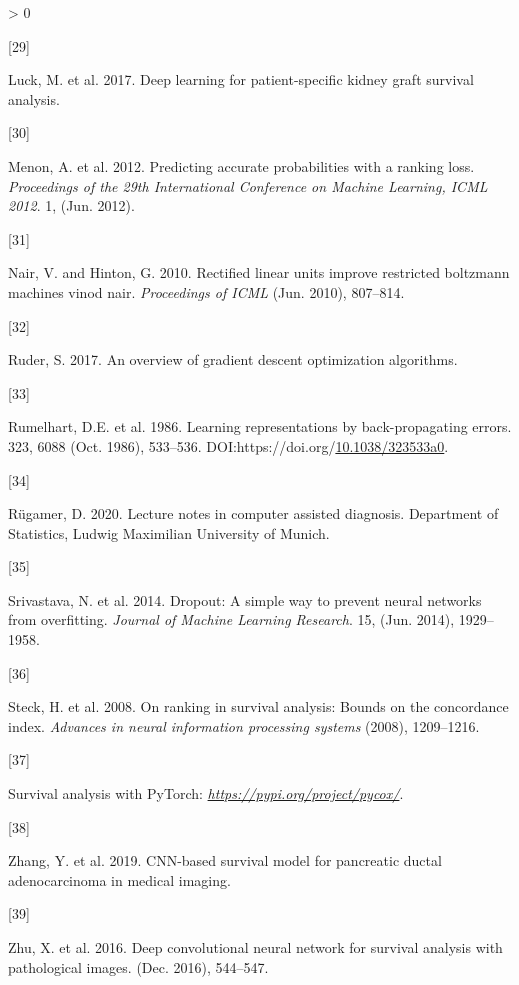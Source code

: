 \documentclass[
]{article}
\newlength{\cslhangindent}
\newlength{\csllabelwidth}
\newenvironment{CSLReferences}[2] %
 {%
  \setlength{\parindent}{0pt}
  \ifodd #1 \everypar{\setlength{\hangindent}{\cslhangindent}}\ignorespaces\fi
  \ifnum #2 > 0
  \setlength{\parskip}{#2\baselineskip}
  \fi
 }%
 {}
\newcommand{\CSLLeftMargin}[1]{\parbox[t]{\csllabelwidth}{#1}}
\newcommand{\CSLRightInline}[1]{\parbox[t]{\linewidth - \csllabelwidth}{#1}\break}
\begin{document}
\begin{CSLReferences}{0}{0}
\leavevmode\hypertarget{ref-luck2017deep}{}%
\CSLLeftMargin{{[}29{]} }
\CSLRightInline{Luck, M. et al. 2017. Deep learning for patient-specific kidney graft survival analysis.}

\leavevmode\hypertarget{ref-menon-ranking}{}%
\CSLLeftMargin{{[}30{]} }
\CSLRightInline{Menon, A. et al. 2012. Predicting accurate probabilities with a ranking loss. \emph{Proceedings of the 29th International Conference on Machine Learning, ICML 2012}. 1, (Jun. 2012).}

\leavevmode\hypertarget{ref-relu}{}%
\CSLLeftMargin{{[}31{]} }
\CSLRightInline{Nair, V. and Hinton, G. 2010. Rectified linear units improve restricted boltzmann machines vinod nair. \emph{Proceedings of ICML} (Jun. 2010), 807--814.}

\leavevmode\hypertarget{ref-gds-optimization}{}%
\CSLLeftMargin{{[}32{]} }
\CSLRightInline{Ruder, S. 2017. An overview of gradient descent optimization algorithms.}

\leavevmode\hypertarget{ref-backprop}{}%
\CSLLeftMargin{{[}33{]} }
\CSLRightInline{Rumelhart, D.E. et al. 1986. {Learning representations by back-propagating errors}. 323, 6088 (Oct. 1986), 533--536. DOI:https://doi.org/\href{https://doi.org/10.1038/323533a0}{10.1038/323533a0}.}

\leavevmode\hypertarget{ref-deeplearning-lmu}{}%
\CSLLeftMargin{{[}34{]} }
\CSLRightInline{Rügamer, D. 2020. Lecture notes in computer assisted diagnosis. Department of Statistics, Ludwig Maximilian University of Munich.}

\leavevmode\hypertarget{ref-dropout}{}%
\CSLLeftMargin{{[}35{]} }
\CSLRightInline{Srivastava, N. et al. 2014. Dropout: A simple way to prevent neural networks from overfitting. \emph{Journal of Machine Learning Research}. 15, (Jun. 2014), 1929--1958.}

\leavevmode\hypertarget{ref-c-idx-bound}{}%
\CSLLeftMargin{{[}36{]} }
\CSLRightInline{Steck, H. et al. 2008. On ranking in survival analysis: Bounds on the concordance index. \emph{Advances in neural information processing systems} (2008), 1209--1216.}

\leavevmode\hypertarget{ref-pycox}{}%
\CSLLeftMargin{{[}37{]} }
\CSLRightInline{Survival analysis with PyTorch: \emph{\url{https://pypi.org/project/pycox/}}.}

\leavevmode\hypertarget{ref-zhang2019cnnbased}{}%
\CSLLeftMargin{{[}38{]} }
\CSLRightInline{Zhang, Y. et al. 2019. CNN-based survival model for pancreatic ductal adenocarcinoma in medical imaging.}

\leavevmode\hypertarget{ref-cnn-sa-1}{}%
\CSLLeftMargin{{[}39{]} }
\CSLRightInline{Zhu, X. et al. 2016. Deep convolutional neural network for survival analysis with pathological images. (Dec. 2016), 544--547.}

\end{CSLReferences}
\end{document}
